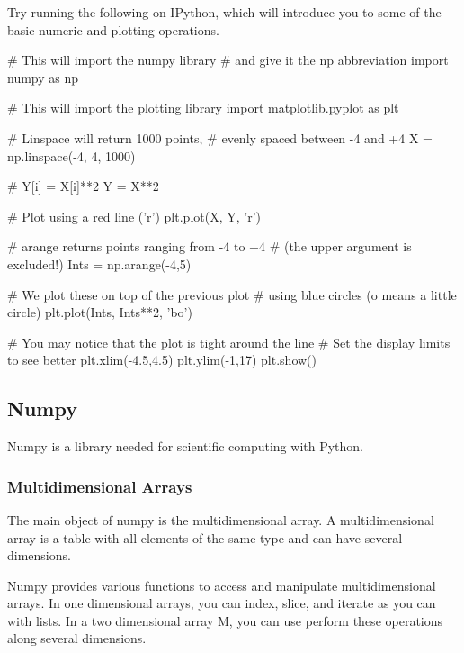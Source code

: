 \begin{exercise}
Try running the following on IPython, which will introduce you to some of the basic numeric and plotting operations.

\begin{python}
# This will import the numpy library
# and give it the np abbreviation
import numpy as np

# This will import the plotting library
import matplotlib.pyplot as plt

# Linspace will return 1000 points,
# evenly spaced between -4 and +4
X = np.linspace(-4, 4, 1000)

# Y[i] = X[i]**2
Y = X**2

# Plot using a red line ('r')
plt.plot(X, Y, 'r')

# arange returns points ranging from -4 to +4
# (the upper argument is excluded!)
Ints = np.arange(-4,5)

# We plot these on top of the previous plot
# using blue circles (o means a little circle)
plt.plot(Ints, Ints**2, 'bo')

# You may notice that the plot is tight around the line
# Set the display limits to see better
plt.xlim(-4.5,4.5)
plt.ylim(-1,17)
plt.show()
\end{python}
\end{exercise}


\subsection{Numpy}

Numpy is a library needed for scientific computing with Python. 

\subsubsection{Multidimensional Arrays}

The main object of numpy is the multidimensional array. A multidimensional
array is a table with all elements of the same type and can have several
dimensions.

Numpy provides various functions to access and manipulate multidimensional
arrays. In one dimensional arrays, you can index, slice, and iterate as you can
with lists. In a two dimensional array M, you can use perform these operations
along several dimensions.

